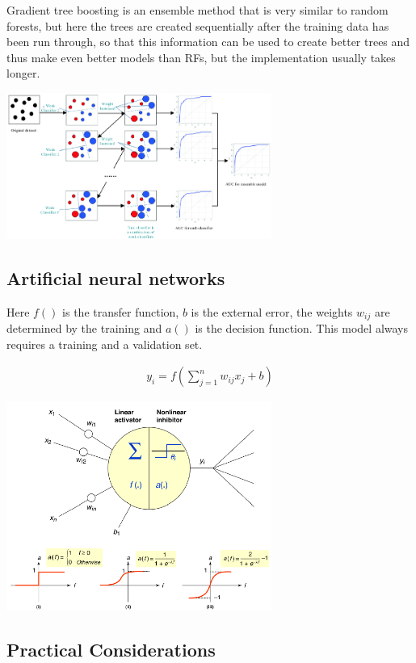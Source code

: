 Gradient tree boosting is an ensemble method that is very similar to random forests, but here the trees are created sequentially after the training data has been run through, so that this information can be used to create better trees and thus make even better models than RFs, but the implementation usually takes longer.

\begin{center}\includegraphics[width=0.65\textwidth]{img/machine/MachineEnsembleGradientTreeBoosting.png}\end{center}

\subsection{Artificial neural networks}


Here $f()$ is the transfer function, $b$ is the external error, the weights $w_{ij}$ are determined by the training and $a()$ is the decision function. This model always requires a training and a validation set.

\begin{align}
    y_i=f\left(\sum_{j=1}^{n}w_{ij}x_j+b\right)
\end{align}

\begin{center}\includegraphics[width=0.65\textwidth]{img/machine/MachineArtificialNeuralNetworks.png}\end{center}

\subsection{Practical Considerations}


